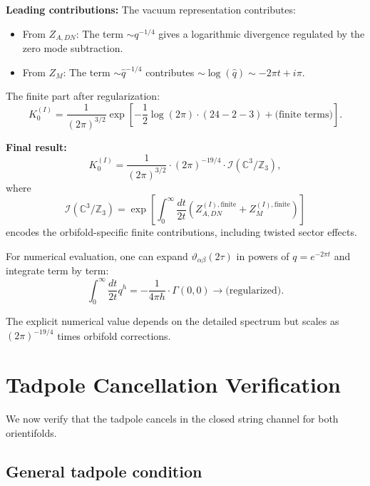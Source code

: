 \documentclass[11pt]{article}
\newcommand{\Z}{\mathbb{Z}}
\newcommand{\C}{\mathbb{C}}
\newcommand{\vt}{\vartheta}
\newcommand{\hq}{\hat{q}}
\begin{document}
\textbf{Leading contributions:} The vacuum representation contributes:
\begin{itemize}
\item From $Z_{A,DN}$: The term $\sim q^{-1/4}$ gives a logarithmic divergence regulated by the zero mode subtraction.
\item From $Z_M$: The term $\sim \hq^{-1/4}$ contributes $\sim \log(\hq) \sim -2\pi t + i\pi$.
\end{itemize}

The finite part after regularization:
\begin{equation}
K_0^{(I)} = \frac{1}{(2\pi)^{3/2}} \exp\left[ -\frac{1}{2}\log(2\pi) \cdot (24 - 2 - 3) + \text{(finite terms)} \right].
\end{equation}

\textbf{Final result:}
\begin{equation}\boxed{
K_0^{(I)} = \frac{1}{(2\pi)^{3/2}} \cdot (2\pi)^{-19/4} \cdot \mathcal{I}(\C^3/\Z_3),
}
\end{equation}
where
\begin{equation}
\mathcal{I}(\C^3/\Z_3) = \exp\left[ \int_0^\infty \frac{dt}{2t} \left( Z_{A,DN}^{(I),\text{finite}} + Z_M^{(I),\text{finite}} \right) \right]
\end{equation}
encodes the orbifold-specific finite contributions, including twisted sector effects.

For numerical evaluation, one can expand $\vt_{\alpha\beta}(2\tau)$ in powers of $q = e^{-2\pi t}$ and integrate term by term:
\begin{equation}
\int_0^\infty \frac{dt}{2t} q^h = -\frac{1}{4\pi h} \cdot \Gamma(0, 0) \to \text{(regularized)}.
\end{equation}

The explicit numerical value depends on the detailed spectrum but scales as $(2\pi)^{-19/4}$ times orbifold corrections.

\section{Tadpole Cancellation Verification}\label{app:tadpole}

We now verify that the tadpole cancels in the closed string channel for both orientifolds.

\subsection{General tadpole condition}
\end{document}

